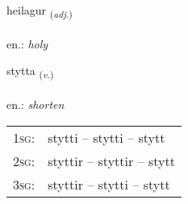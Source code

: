 \documentclass[frontgrid, backgrid]{flacards}\usepackage[]{graphicx}\usepackage[]{xcolor}
\begin{document}
\renewcommand{\flhead}{\vskip5pt \fboxsep=0pt {\small\bfseries\footnotesize Lýsingarorð | Adjective}}
\renewcommand{\fcfoot}{\vskip5pt \fboxsep=0pt \hspace{2pt}{\small\bfseries\footnotesize 2K}}

\renewcommand{\blhead}{\vskip5pt {\small\bfseries\footnotesize Lýsingarorð | Adjective }}
\renewcommand{\bcfoot}{\vskip5pt \hspace{2pt}{\small\bfseries\footnotesize 2K}}


{heilagur \small{\textsubscript{(\textit{adj.})}} \\[1ex] %
\textphonetic{[heiːlaɣʏr]} \\
en.: \emph{holy} \\  [2ex]
\renewcommand*{\arraystretch}{0.8}
}

\renewcommand{\flhead}{\vskip5pt \fboxsep=0pt {\small\bfseries\footnotesize Sagnorð | Verb}}
\renewcommand{\fcfoot}{\vskip5pt \fboxsep=0pt \hspace{2pt}{\small\bfseries\footnotesize 2K}}

\renewcommand{\blhead}{\vskip5pt {\small\bfseries\footnotesize Sagnorð | Verb }}
\renewcommand{\bcfoot}{\vskip5pt \hspace{2pt}{\small\bfseries\footnotesize 2K}}


{stytta \small{\textsubscript{(\textit{v.})}} \\[1ex] %
\textphonetic{[stɪhta]} \\
en.: \emph{shorten} \\  [2ex]
\renewcommand*{\arraystretch}{0.8}
\begin{tabular}{p{1cm}l}
\textsc{1sg}: & stytti -- stytti -- stytt \\ 
\textsc{2sg}: & styttir -- styttir -- stytt \\ 
\textsc{3sg}: & styttir -- stytti -- stytt \\ 
\end{tabular}
}
\end{document}
